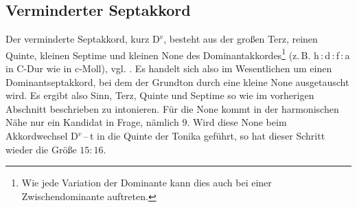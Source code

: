 \subsection{Verminderter Septakkord}
\label{sec:dim7syn}


Der verminderte Septakkord, kurz D$^v$, besteht aus der großen Terz, reinen
Quinte, kleinen Septime und kleinen None des Dominantakkordes\footnote{Wie jede
  Variation der Dominante kann dies auch bei einer Zwischendominante auftreten.}
(z.\,B. h\,:\,d\,:\,f\,:\,\flat a in C-Dur wie in c-Moll),
vgl. \cite[{}11.1]{Skript}. Es handelt sich also im Wesentlichen um einen
Dominantseptakkord, bei dem der Grundton durch eine kleine None ausgetauscht
wird. Es ergibt also Sinn, Terz, Quinte und Septime so wie im vorherigen
Abschnitt beschrieben zu intonieren. Für die None kommt in der harmonischen Nähe
nur ein Kandidat in Frage, nämlich \flatp $9$.  Wird diese None beim
Akkordwechsel D$^v$\,–\,t in die Quinte der Tonika geführt, so hat dieser
Schritt wieder die Größe $15:16$.

